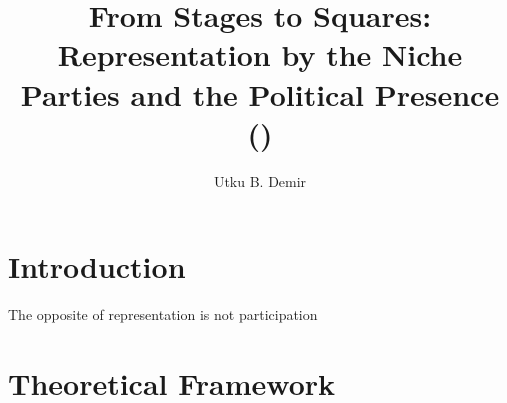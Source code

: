 
\usepackage{tcolorbox}
\title{From Stages to Squares: Representation by the Niche Parties and the Political Presence ()}
\author{Utku B. Demir}


\maketitle

\chapter{Introduction}\label{chap:Introduction}
\epigraph{The opposite of representation is not participation}{\cite[19]{plotke1997}}

\chapter{Theoretical Framework}\label{chap:Theoretical Framework and Current Debates}

